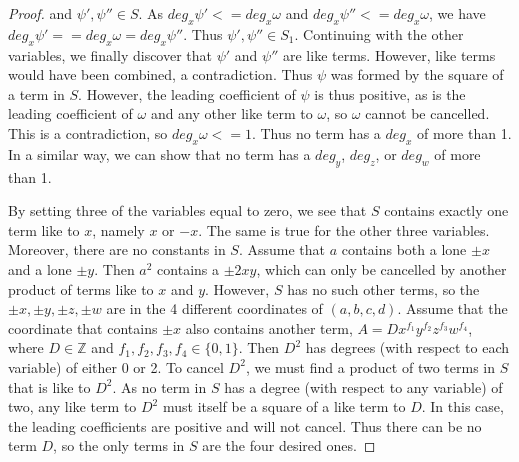 \documentclass[12pt]{article}
\theoremstyle{definition}
\theoremstyle{remark}
\newcommand{\Zzz}{\mathbb Z}
\numberwithin{equation}{section}
\begin{document}
\begin{proof}
and \( \psi' , \psi'' \in S \). As \( deg_x \psi' <= deg_x \omega \)
and \( deg_x \psi'' <= deg_x \omega \),
we have \( deg_x \psi' == deg_x \omega = deg_x \psi'' \).
Thus \( \psi' , \psi'' \in S_1 \). Continuing with the other variables, we
finally discover that \( \psi' \) and \( \psi'' \) are like terms. However,
like terms would have been combined, a contradiction. Thus \( \psi \) was
formed by the square of a term in \( S \). However, the leading coefficient
of \( \psi \) is thus positive, as is the leading coefficient of \( \omega \) and
any other like term to \( \omega \), so \( \omega \) cannot be cancelled. This is
a contradiction, so \( deg_x \omega <= 1 \). Thus no term has a \( deg_x \) of more
than 1. In a similar way, we can show that no term has a \( deg_y \), \( deg_z \),
or \( deg_w \) of more than 1.

By setting three of the variables equal to zero, we see that \( S \) contains
exactly one term like to \( x \), namely \( x\) or \( -x \). The same is true for
the other three variables. Moreover, there are no constants in \( S \). Assume that
\( a \) contains both a lone \( \pm x \) and a lone \( \pm y \). Then \(a^2\) contains
a \( \pm 2xy \), which can only be cancelled by another product of terms like to
\( x \) and \(y\). However, \( S \) has no such other terms,
so the \( \pm x, \pm y, \pm z, \pm w \) are in the 4 different coordinates of
\( (a, b, c, d) \). Assume that the coordinate that contains \( \pm x \) also contains
another term, \( A = Dx^{f_1}y^{f_2}z^{f_3}w^{f_4}\), where \( D \in \Zzz \)
and \( f_1,f_2,f_3,f_4 \in \{0,1\} \). Then \( D^2 \) has degrees (with respect to
each variable) of either 0 or 2. To cancel \( D^2 \), we must find a product of two
terms in \( S \) that is like to \( D^2 \). As no term in \( S \) has a degree
(with respect to any variable) of two, any like term to \( D^2 \) must itself be
a square of a like term to \( D \). In this case, the leading coefficients are
positive and will not cancel. Thus there can be no term \( D \), so the only terms
in \( S \) are the four desired ones.
\end{proof}
\end{document}
